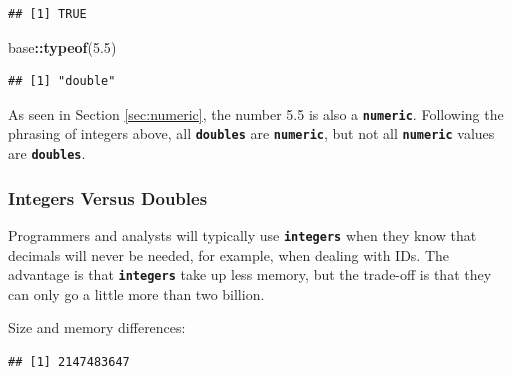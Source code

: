 \documentclass[
]{book}
\newenvironment{Shaded}{\begin{snugshade}}{\end{snugshade}}
\newcommand{\CommentTok}[1]{\textcolor[rgb]{0.56,0.35,0.01}{\textit{#1}}}
\newcommand{\FloatTok}[1]{\textcolor[rgb]{0.00,0.00,0.81}{#1}}
\newcommand{\FunctionTok}[1]{\textcolor[rgb]{0.13,0.29,0.53}{\textbf{#1}}}
\newcommand{\NormalTok}[1]{#1}
\newcommand{\SpecialCharTok}[1]{\textcolor[rgb]{0.81,0.36,0.00}{\textbf{#1}}}
\begin{document}
\begin{verbatim}
## [1] TRUE
\end{verbatim}

\begin{Shaded}
\begin{Highlighting}[]
\NormalTok{base}\SpecialCharTok{::}\FunctionTok{typeof}\NormalTok{(}\FloatTok{5.5}\NormalTok{)}
\end{Highlighting}
\end{Shaded}

\begin{verbatim}
## [1] "double"
\end{verbatim}

As seen in Section \ref{sec:numeric}, the number 5.5 is also a \textbf{\texttt{numeric}}. Following the phrasing of integers above, all \textbf{\texttt{doubles}} are \textbf{\texttt{numeric}}, but not all \textbf{\texttt{numeric}} values are \textbf{\texttt{doubles}}.

\subsubsection{Integers Versus Doubles}\label{integers-versus-doubles}

Programmers and analysts will typically use \textbf{\texttt{integers}} when they know that decimals will never be needed, for example, when dealing with IDs. The advantage is that \textbf{\texttt{integers}} take up less memory, but the trade-off is that they can only go a little more than two billion.

Size and memory differences:

\begin{Shaded}
\end{Shaded}

\begin{verbatim}
## [1] 2147483647
\end{verbatim}

\begin{Shaded}
\end{Shaded}
\end{document}
